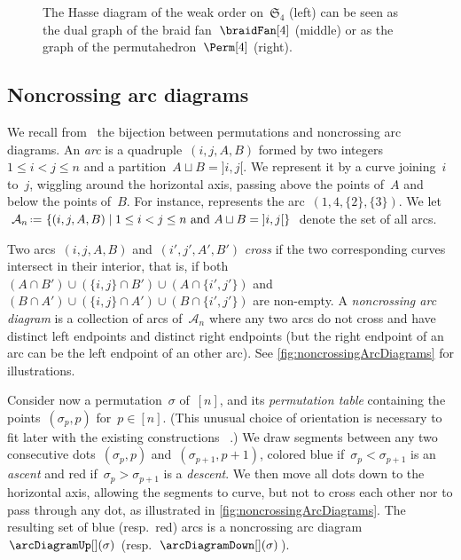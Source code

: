 \documentclass{amsart}
\theoremstyle{definition}
\newcommand{\f}[1]{{\mathfrak{#1}}} %
\newcommand{\set}[2]{\left\{ #1 \;\middle|\; #2 \right\}} %
\newcommand{\eqdef}{\mbox{\,\raisebox{0.2ex}{\scriptsize\ensuremath{\mathrm:}}\ensuremath{=}\,}} %
\newcommand{\darkblue}{\color{darkblue}} %
\newcommand{\defn}[1]{\textsl{\darkblue #1}} %
\newcommand{\arcs}{{\mathcal{A}}} %
\begin{document}
\begin{figure}
	\caption{The Hasse diagram of the weak order on~$\f{S}_4$ (left) can be seen as the dual graph of the braid fan~$\braidFan[4]$ (middle) or as the graph of the permutahedron~$\Perm[4]$ (right). \cite[Fig.~1]{PilaudSantos-quotientopes}}
	\label{fig:weakOrder4}
\end{figure}


\subsection{Noncrossing arc diagrams}
\label{subsec:noncrossingArcDiagrams}

We recall from~\cite{Reading-arcDiagrams} the bijection between permutations and noncrossing arc diagrams.
An \defn{arc} is a quadruple~$(i, j, A, B)$ formed by two integers $1 \le i < j \le n$ and a partition~${A \sqcup B = {]i,j[}}$.
We represent it by a curve joining~$i$ to~$j$, wiggling around the horizontal axis, passing above the points of~$A$ and below the points of~$B$.
For instance,  represents the arc~$(1,4,\{2\},\{3\})$.
We let~$\arcs_n \eqdef \set{(i, j, A, B)}{1 \le i < j \le n \text{ and } A \sqcup B = {]i,j[}}$ denote the set of all arcs.

Two arcs~$(i, j, A, B)$ and~$(i', j', A', B')$ \defn{cross} if the two corresponding curves intersect in their interior, that is, if both~$(A \cap B') \cup (\{i,j\} \cap B') \cup (A \cap \{i',j'\})$ and~$(B \cap A') \cup (\{i,j\} \cap A') \cup (B \cap \{i',j'\})$ are non-empty.
A \defn{noncrossing arc diagram} is a collection of arcs of~$\arcs_n$ where any two arcs do not cross and have distinct left endpoints and distinct right endpoints (but the right endpoint of an arc can be the left endpoint of an other arc).
See \cref{fig:noncrossingArcDiagrams} for illustrations.

Consider now a permutation~$\sigma$ of~$[n]$, and its \defn{permutation table} containing the points~$(\sigma_p, p)$ for~$p \in [n]$.
(This unusual choice of orientation is necessary to fit later with the existing constructions ~\cite{LodayRonco, HivertNovelliThibon-algebraBinarySearchTrees, ChatelPilaud, PilaudPons-permutrees}.)
We draw segments between any two consecutive dots~$(\sigma_p, p)$ and~$(\sigma_{p+1}, p+1)$, colored blue if~$\sigma_p < \sigma_{p+1}$ is an \defn{ascent} and red if~$\sigma_p > \sigma_{p+1}$ is a \defn{descent}.
We then move all dots down to the horizontal axis, allowing the segments to curve, but not to cross each other nor to pass through any dot, as illustrated in \cref{fig:noncrossingArcDiagrams}.
The resulting set of blue (resp.~red) arcs is a noncrossing arc diagram~$\arcDiagramUp[](\sigma)$ (resp.~$\arcDiagramDown[](\sigma)$).
\end{document}
